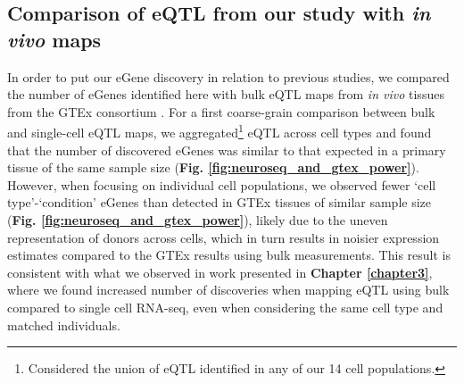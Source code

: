 \clearpage

\subsection{Comparison of eQTL from our study with \textit{in vivo} maps}

In order to put our eGene discovery in relation to previous studies, we compared the number of eGenes identified here with bulk eQTL maps from \textit{in vivo} tissues from the GTEx consortium \cite{gtex2017genetic}. 
For a first coarse-grain comparison between bulk and single-cell eQTL maps,
we aggregated\footnote{Considered the union of eQTL identified in any of our 14 cell populations.} eQTL across cell types and found that the number of discovered eGenes was similar to that expected in a primary tissue of the same sample size (\textbf{Fig. \ref{fig:neuroseq_and_gtex_power}}). \\

However, when focusing on individual cell populations, we observed fewer `cell type'-`condition' eGenes than detected in GTEx tissues of similar sample size (\textbf{Fig. \ref{fig:neuroseq_and_gtex_power}}), likely due to the uneven representation of donors across cells, which in turn results in noisier expression estimates compared to the GTEx results using bulk measurements.
This result is consistent with what we observed in work presented in \textbf{Chapter \ref{chapter3}}, where we found increased number of discoveries when mapping eQTL using bulk compared to single cell RNA-seq, even when considering the same cell type and matched individuals. 

\vspace{2mm}

